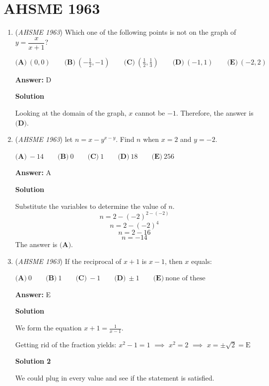 \section{AHSME 1963}
        \begin{enumerate}
        	\item (\textit{AHSME 1963}) Which one of the following points is not on the graph of $y=\dfrac{x}{x+1}$?


 $\textbf{(A)}\ (0,0)\qquad \textbf{(B)}\ \left(-\frac{1}{2},-1\right)\qquad \textbf{(C)}\ \left(\frac{1}{2},\frac{1}{3}\right)\qquad \textbf{(D)}\ (-1,1)\qquad \textbf{(E)}\ (-2,2)$

 \textbf{Answer: }D



\textbf{Solution}

Looking at the domain of the graph, $x$ cannot be $-1$. Therefore, the answer is $\boxed{\textbf{(D)}}$.

 


	\item (\textit{AHSME 1963}) let $n=x-y^{x-y}$. Find $n$ when $x=2$ and $y=-2$.


 $\textbf{(A)}\ -14 \qquad \textbf{(B)}\ 0 \qquad \textbf{(C)}\ 1 \qquad \textbf{(D)}\ 18 \qquad \textbf{(E)}\ 256$

 \textbf{Answer: }A



\textbf{Solution}

Substitute the variables to determine the value of $n$.
 \[n = 2 - (-2)^{2-(-2)}\]
 \[n = 2 - (-2)^4\]
 \[n = 2 - 16\]
 \[n = -14\]The answer is $\boxed{\textbf{(A)}}$.

 


	\item (\textit{AHSME 1963}) If the reciprocal of $x+1$ is $x-1$, then $x$ equals:


 $\textbf{(A)}\ 0\qquad \textbf{(B)}\ 1\qquad \textbf{(C)}\ -1\qquad \textbf{(D)}\ \pm 1\qquad \textbf{(E)}\ \text{none of these}$

 \textbf{Answer: }E



\textbf{Solution}

We form the equation $x+1=\frac{1}{x-1}$.  

 Getting rid of the fraction yields: $x^2-1=1$ $\implies$ $x^2=2$ $\implies$ $x=\pm{\sqrt{2}}=\boxed{\text{E}}$




\textbf{Solution 2}

We could plug in every value and see if the statement is satisfied.


\end{enumerate}
